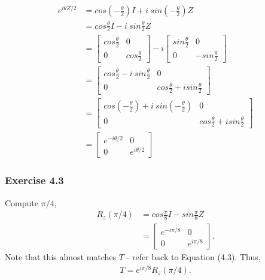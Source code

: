 \begin{align}
    e^{i \theta Z / 2} &= cos( - \frac \theta 2) I + i\ sin( - \frac \theta 2) Z \\
    &= cos \frac \theta 2 I - i\ sin \frac \theta 2 Z \\
    &= \left[ \begin{matrix} cos \frac \theta 2 & 0 \\ 0 & cos \frac \theta 2 \end{matrix} \right] - i
        \left[ \begin{matrix} sin \frac \theta 2 & 0 \\ 0 & - sin \frac \theta 2\end{matrix} \right] \\
    &= \left[ \begin{matrix} cos \frac \theta 2 - i\ sin \frac \theta 2 & 0 \\
        0 & cos \frac \theta 2 + i sin \frac \theta 2 \end{matrix} \right] \\
    &= \left[ \begin{matrix} cos(- \frac \theta 2) + i\ sin(- \frac \theta 2) & 0 \\
        0 & cos \frac \theta 2 + i sin \frac \theta 2 \end{matrix} \right] \\
    &= \left[ \begin{matrix} e^{-i \theta/2} & 0 \\ 0 & e^{i \theta/2} \end{matrix} \right]
\end{align}


\subsubsection{Exercise 4.3}
Compute $\pi/4$,
\begin{align}
    R_z(\pi/4) &= cos \frac{\pi}{8} I - sin \frac{\pi}{8} Z \\
    &= \left[ \begin{matrix} e^{-i \pi/8} & 0 \\ 0 & e^{i \pi/8} \end{matrix} \right].
\end{align}
Note that this almost matches $T$ - refer back to Equation (4.3).
Thus,
\begin{align}
    T = e^{i \pi/8} R_z(\pi/4).
\end{align}

